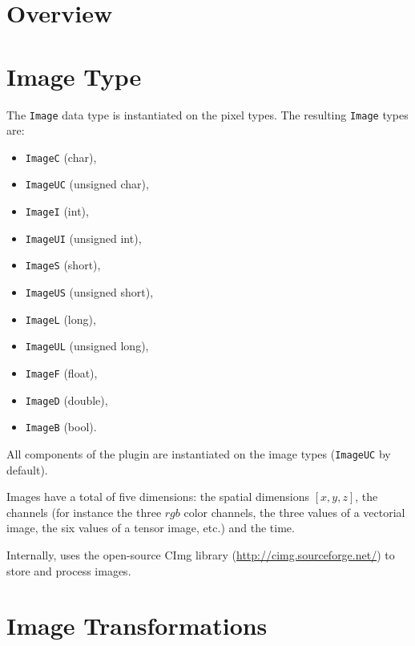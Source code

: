 \section{Overview}


\section{Image Type}

\noindent The \texttt{Image} data type is instantiated on the pixel types. The resulting \texttt{Image} types are:  
\begin{itemize}
	\item \texttt{ImageC}  (char),
	\item \texttt{ImageUC} (unsigned char),
	\item \texttt{ImageI}  (int),
	\item \texttt{ImageUI} (unsigned int),
	\item \texttt{ImageS}  (short),
	\item \texttt{ImageUS} (unsigned short),
	\item \texttt{ImageL}  (long),
	\item \texttt{ImageUL} (unsigned long),
	\item \texttt{ImageF}  (float),
	\item \texttt{ImageD}  (double),
	\item \texttt{ImageB}  (bool).
\end{itemize}

\noindent All components of the plugin are instantiated on the image types (\texttt{ImageUC} by default).

\noindent Images have a total of five dimensions: the spatial dimensions $[x,y,z]$, the channels (for instance the three $rgb$ color channels, the three values of a vectorial image, the six values of a tensor image, etc.) and the time.

\noindent Internally, \sofa{} uses the open-source CImg library (\url{http://cimg.sourceforge.net/}) to store and process images. 

\section{Image Transformations}

